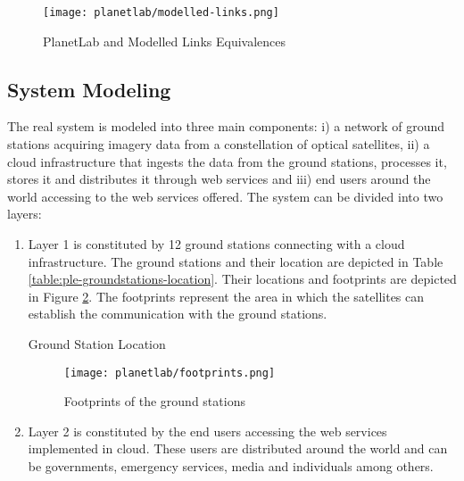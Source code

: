 \begin{figure}[!h]
\begin{center}
\texttt{[image: planetlab/modelled-links.png]}
\caption{PlanetLab and Modelled Links Equivalences}
\label{fig:ple-modelled-links}
\end{center}
\end{figure}


\subsection{System Modeling}

The real system is modeled into three main components: i) a network of ground stations acquiring imagery data from a constellation of optical satellites, ii) a cloud infrastructure that ingests the data from the ground stations, processes it, stores it and distributes it through web services and iii) end users around the world accessing to the web services offered. The system can be divided into two layers: 

\begin{enumerate}

\item Layer 1 is constituted by 12 ground stations connecting with a cloud
  infrastructure. The ground stations and their location are depicted in Table \ref{table:ple-groundstations-location}. Their locations and footprints are depicted in Figure \ref{fig:ple-footprints}. The footprints represent the area in which the satellites can establish the communication with the ground stations.

\begin{table}[hp]
  \centering
  {\small
  
  }
  \caption{Ground Station Location}
  \label{table:ple-groundstations-location}
\end{table}

\begin{figure}[!h]
\begin{center}
\texttt{[image: planetlab/footprints.png]}

\caption{Footprints of the ground stations}
\label{fig:ple-footprints}
\end{center}
\end{figure}


\item Layer 2 is constituted by the end users accessing the web services
  implemented in cloud. These users are distributed around the world and can be
  governments, emergency services, media and individuals among others.
\end{enumerate}

